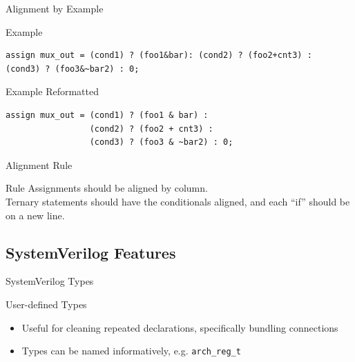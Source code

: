 \documentclass[dvipsnames]{beamer}
\begin{document}
\begin{frame}[fragile]{Alignment by Example}
	\begin{block}{Example}
		\begin{verbatim}
assign mux_out = (cond1) ? (foo1&bar): (cond2) ? (foo2+cnt3) :
(cond3) ? (foo3&~bar2) : 0;
		\end{verbatim}
	\end{block}
	\pause
	\begin{block}{Example Reformatted}
		\begin{verbatim}
assign mux_out = (cond1) ? (foo1 & bar) :
                 (cond2) ? (foo2 + cnt3) :
                 (cond3) ? (foo3 & ~bar2) : 0;
		\end{verbatim}
	\end{block}
\end{frame}

\begin{frame}{Alignment Rule}
	\begin{block}{Rule}
		Assignments should be aligned by column. \\
		Ternary statements should have the conditionals aligned, and each ``if''
		should be on a new line.
	\end{block}
\end{frame}


\subsection{SystemVerilog Features}

\begin{frame}{SystemVerilog Types}
	\begin{block}{User-defined Types}
		\begin{itemize}
			\item Useful for cleaning repeated declarations, specifically
				bundling connections
			\item Types can be named informatively, e.g. \texttt{arch\_reg\_t}
		\end{itemize}
	\end{block}
\end{frame}
\end{document}

